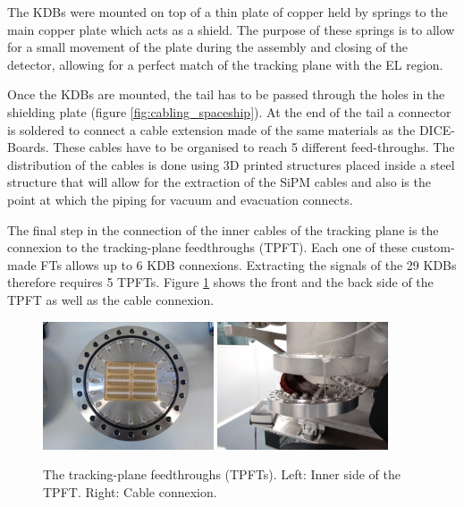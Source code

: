 The KDBs were mounted on top of a thin plate of copper held by springs to the main copper plate which acts as a shield. The purpose of these springs is to allow for a small movement of the plate during the assembly and closing of the detector, allowing for a perfect match of the tracking plane with the EL region. 

Once the KDBs are mounted, the tail has to be passed through the holes in the shielding plate (figure \ref{fig:cabling_spaceship}). At the end of the tail a connector is soldered to connect a cable extension made of the same materials as the DICE-Boards. These cables have to be organised to reach 5 different feed-throughs. The distribution of the cables is done using 3D printed structures placed inside a steel structure that will allow for the extraction of the SiPM cables and also is the point at which the piping for vacuum and evacuation connects.


The final step in the connection of the inner cables of the tracking plane is the connexion to the tracking-plane feedthroughs (TPFT). Each one of these custom-made FTs allows up to 6 KDB connexions. Extracting the signals of the 29 KDBs therefore requires 5 TPFTs. Figure \ref{fig:TPFT} shows the front and the back side of the TPFT as well as the cable connexion.

\begin{figure}[hpt!]
\centering
\includegraphics[width=0.45\textwidth]{img2/TPFT1.png}
\includegraphics[width=0.45\textwidth]{img2/TPFT_connected.png}
\caption{The tracking-plane feedthroughs (TPFTs). Left: Inner side of the TPFT. Right: Cable connexion.}
\label{fig:TPFT}
\end{figure}


